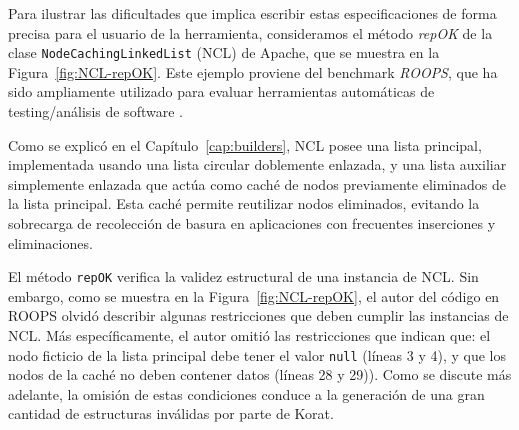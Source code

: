 Para ilustrar las dificultades que implica escribir estas especificaciones de
forma precisa para el usuario de la herramienta, consideramos el método 
\emph{repOK} de la clase \texttt{NodeCachingLinkedList} (NCL) de Apache, que se
muestra en la Figura~\ref{fig:NCL-repOK}. 
Este ejemplo proviene del benchmark \emph{ROOPS}, que ha sido ampliamente
utilizado para evaluar herramientas automáticas de testing/análisis de software 
\cite{} . 

Como se explicó en el Capítulo~\ref{cap:builders}, NCL posee una lista
principal, implementada usando una lista circular doblemente enlazada, 
y una lista auxiliar simplemente enlazada que actúa como caché de nodos
previamente eliminados de la lista principal. Esta caché permite reutilizar 
nodos eliminados, evitando la sobrecarga de recolección de basura en aplicaciones con frecuentes inserciones y eliminaciones.

El método \texttt{repOK} verifica la validez estructural de una instancia de
NCL. Sin embargo, como se muestra en la Figura~\ref{fig:NCL-repOK}, el
autor del código en ROOPS olvidó describir algunas restricciones que deben
cumplir las instancias de NCL. Más específicamente, el autor omitió las
restricciones que indican que: el nodo ficticio de la lista principal debe tener el
valor \texttt{null} (líneas 3 y 4), y que los nodos de la caché no deben 
contener datos (líneas 28 y 29)). Como se discute más adelante, la omisión de estas 
condiciones conduce a la generación de una gran cantidad de estructuras
inválidas por parte de Korat.

